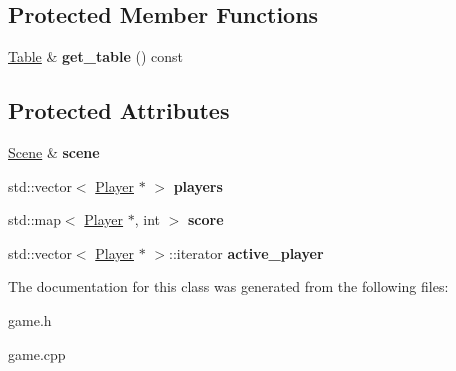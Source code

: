 \subsection*{Protected Member Functions}
\begin{DoxyCompactItemize}
\item 
\hypertarget{class_game_af73fb29b654672cc51efef4ada5748b7}{
\hyperlink{class_table}{Table} \& {\bfseries get\_\-table} () const }
\label{class_game_af73fb29b654672cc51efef4ada5748b7}

\end{DoxyCompactItemize}
\subsection*{Protected Attributes}
\begin{DoxyCompactItemize}
\item 
\hypertarget{class_game_a62066a698e793b1614c4b614a653e459}{
\hyperlink{class_scene}{Scene} \& {\bfseries scene}}
\label{class_game_a62066a698e793b1614c4b614a653e459}

\item 
\hypertarget{class_game_a02c9740ee200db355a248d81766870e9}{
std::vector$<$ \hyperlink{class_player}{Player} $\ast$ $>$ {\bfseries players}}
\label{class_game_a02c9740ee200db355a248d81766870e9}

\item 
\hypertarget{class_game_a1e9031abb87b482fae933ae7ac432a62}{
std::map$<$ \hyperlink{class_player}{Player} $\ast$, int $>$ {\bfseries score}}
\label{class_game_a1e9031abb87b482fae933ae7ac432a62}

\item 
\hypertarget{class_game_a664e7d2520741d623f3edd556586eab0}{
std::vector$<$ \hyperlink{class_player}{Player} $\ast$ $>$::iterator {\bfseries active\_\-player}}
\label{class_game_a664e7d2520741d623f3edd556586eab0}

\end{DoxyCompactItemize}


The documentation for this class was generated from the following files:\begin{DoxyCompactItemize}
\item 
game.h\item 
game.cpp\end{DoxyCompactItemize}
